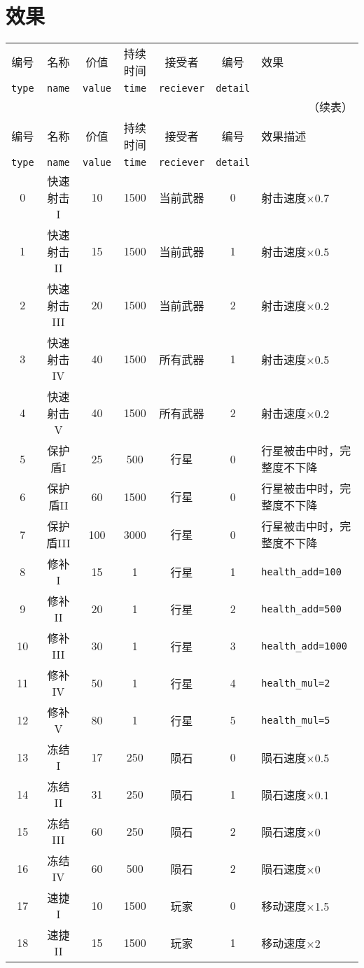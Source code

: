 \documentclass[UTF8,fontset=none,linespread=1.2]{ctexart}
\begin{document}
\section{效果}
\begin{center}
\begin{longtable}{|c|c|c|c|c|c|>{\centering\arraybackslash}m{10cm}|}
\hline
编号&名称&价值&持续时间&接受者&编号&效果\\
\lstinline|type|&\lstinline|name|&\lstinline|value|&\lstinline|time|&\lstinline|reciever|&\lstinline|detail|&\\\hline
\endfirsthead
\multicolumn{7}{r}{（续表）}\\\hline
编号&名称&价值&持续时间&接受者&编号&效果描述\\
\lstinline|type|&\lstinline|name|&\lstinline|value|&\lstinline|time|&\lstinline|reciever|&\lstinline|detail|&\\\hline
\endhead
0&快速射击I&10&1500&当前武器&0&射击速度×0.7\\\hline
1&快速射击II&15&1500&当前武器&1&射击速度×0.5\\\hline
2&快速射击III&20&1500&当前武器&2&射击速度×0.2\\\hline
3&快速射击IV&40&1500&所有武器&1&射击速度×0.5\\\hline
4&快速射击V&40&1500&所有武器&2&射击速度×0.2\\\hline
5&保护盾I&25&500&行星&0&行星被击中时，完整度不下降\\\hline
6&保护盾II&60&1500&行星&0&行星被击中时，完整度不下降\\\hline
7&保护盾III&100&3000&行星&0&行星被击中时，完整度不下降\\\hline
8&修补I&15&1&行星&1&\lstinline|health_add=100|\\\hline
9&修补II&20&1&行星&2&\lstinline|health_add=500|\\\hline
10&修补III&30&1&行星&3&\lstinline|health_add=1000|\\\hline
11&修补IV&50&1&行星&4&\lstinline|health_mul=2|\\\hline
12&修补V&80&1&行星&5&\lstinline|health_mul=5|\\\hline
13&冻结I&17&250&陨石&0&陨石速度×0.5\\\hline
14&冻结II&31&250&陨石&1&陨石速度×0.1\\\hline
15&冻结III&60&250&陨石&2&陨石速度×0\\\hline
16&冻结IV&60&500&陨石&2&陨石速度×0\\\hline
17&速捷I&10&1500&玩家&0&移动速度×1.5\\\hline
18&速捷II&15&1500&玩家&1&移动速度×2\\\hline

\end{longtable}
\end{center}
\end{document}
